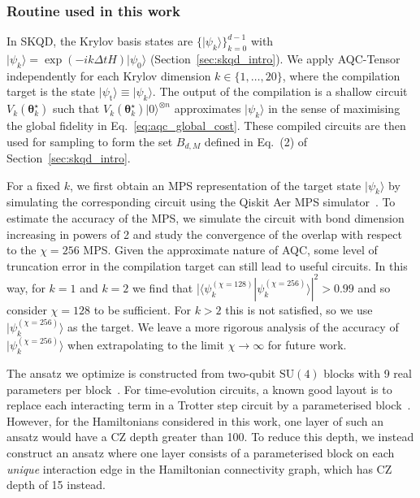 \documentclass[
  reprint,            %
  amsmath,amssymb,
  aps,
  superscriptaddress, %
  longbibliography
]{revtex4-2}
\theoremstyle{definition}
\begin{document}
\subsubsection{Routine used in this work}
In SKQD, the Krylov basis states are $\{\lvert \psi_k\rangle\}_{k=0}^{d-1}$ with $\lvert \psi_k\rangle = \exp(-ik\Delta t H)\lvert \psi_0\rangle$ (Section~\ref{sec:skqd_intro}). We apply AQC-Tensor independently for each Krylov dimension $k \in \{1,\ldots,20\}$, where the compilation target is the state $\lvert \psi_{\mathrm{t}} \rangle \equiv \lvert \psi_k\rangle$. The output of the compilation is a shallow circuit $V_k(\boldsymbol{\theta}_k^\star)$ such that $V_k(\boldsymbol{\theta}_k^\star)\lvert 0\rangle^{\otimes n}$ approximates $\lvert \psi_k\rangle$ in the sense of maximising the global fidelity in Eq.~\eqref{eq:aqc_global_cost}. These compiled circuits are then used for sampling to form the set $B_{d,M}$ defined in Eq.~(2) of Section~\ref{sec:skqd_intro}.

For a fixed $k$, we first obtain an MPS representation of the target state $\lvert \psi_k\rangle$ by simulating the corresponding circuit using the Qiskit Aer MPS simulator~\cite{qiskit2024}. To estimate the accuracy of the MPS, we simulate the circuit with bond dimension increasing in powers of 2 and study the convergence of the overlap with respect to the $\chi=256$ MPS. Given the approximate nature of AQC, some level of truncation error in the compilation target can still lead to useful circuits. In this way, for $k=1$ and $k=2$ we find that |$\langle\psi_k^{(\chi=128)}|\psi_k^{(\chi=256)}\rangle|^2 > 0.99$ and so consider $\chi=128$ to be sufficient. For $k>2$ this is not satisfied, so we use $|\psi_k^{(\chi=256)}\rangle$ as the target. We leave a more rigorous analysis of the accuracy of $|\psi_k^{(\chi=256)}\rangle$ when extrapolating to the limit $\chi\rightarrow\infty$ for future work.

The ansatz we optimize is constructed from two-qubit $\mathrm{SU}(4)$ blocks with 9 real parameters per block~\cite{ibm_aqctensor_docs}. For time-evolution circuits, a known good layout is to replace each interacting term in a Trotter step circuit by a parameterised block~\cite{robertson2025approximate}. However, for the Hamiltonians considered in this work, one layer of such an ansatz would have a CZ depth greater than 100. To reduce this depth, we instead construct an ansatz where one layer consists of a parameterised block on each \emph{unique} interaction edge in the Hamiltonian connectivity graph, which has CZ depth of 15 instead.
\end{document}
